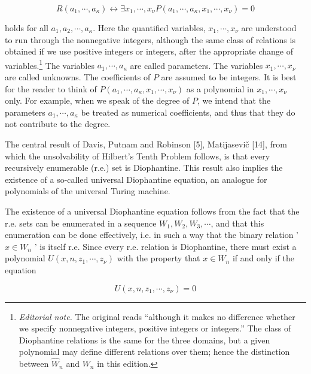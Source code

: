 \documentclass[11pt,a4paper]{article}
\newcommand{\origpage}[1]{\marginnote{\footnotesize\textbf{[#1]}}}
\newcommand{\ednote}[1]{\footnote{\textit{Editorial note.} #1}}
\newcommand{\WW}{\widehat W}
\begin{document}
\begin{equation*}
R\left(a_{1}, \cdots, a_{\kappa}\right) \leftrightarrow \exists x_{1}, \cdots, x_{\nu} P\left(a_{1}, \cdots, a_{\kappa}, x_{1}, \cdots, x_{\nu}\right)=0 \tag{1.1}
\end{equation*}


\origpage{337}holds for all $a_{1}, a_{2}, \cdots, a_{\kappa}$. Here the quantified variables, $x_{1}, \cdots, x_{\nu}$ are understood to run through the nonnegative integers, although the same class of relations is obtained if we use positive integers or integers, after the appropriate change of variables.\ednote{The original reads ``although it makes no difference whether we specify nonnegative integers, positive integers or integers.'' The class of Diophantine relations is the same for the three domains, but a given polynomial may define different relations over them; hence the distinction between $\WW_n$ and $W_n$ in this edition.} The variables $a_{1}, \cdots, a_{\kappa}$ are called parameters. The variables $x_{1}, \cdots, x_{\nu}$ are called unknowns. The coefficients of $P$ are assumed to be integers. It is best for the reader to think of $P\left(a_{1}, \cdots, a_{\kappa}, x_{1}, \cdots, x_{\nu}\right)$ as a polynomial in $x_{1}, \cdots, x_{\nu}$ only. For example, when we speak of the degree of $P$, we intend that the parameters $a_{1}, \cdots, a_{\kappa}$ be treated as numerical coefficients, and thus that they do not contribute to the degree.

The central result of Davis, Putnam and Robinson [5], Matijasevič [14], from which the unsolvability of Hilbert's Tenth Problem follows, is that every recursively enumerable (r.e.) set is Diophantine. This result also implies the existence of a so-called universal Diophantine equation, an analogue for polynomials of the universal Turing machine.

The existence of a universal Diophantine equation follows from the fact that the r.e. sets can be enumerated in a sequence $W_{1}, W_{2}, W_{3}, \cdots$, and that this enumeration can be done effectively, i.e. in such a way that the binary relation ' $x \in W_{n}$ ' is itself r.e. Since every r.e. relation is Diophantine, there must exist a polynomial $U\left(x, n, z_{1}, \cdots, z_{\nu}\right)$ with the property that $x \in W_{n}$ if and only if the equation


\begin{equation*}
U\left(x, n, z_{1}, \cdots, z_{\nu}\right)=0 \tag{1.2}
\end{equation*}
\end{document}
